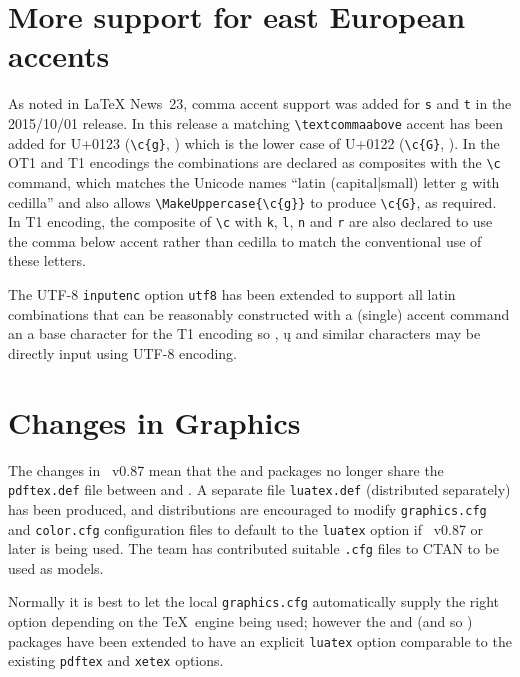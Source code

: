 \documentclass{ltnews}
\begin{document}
\section{More support for east European accents}

As noted in \LaTeX{} News~23, comma accent support was added for \texttt{s} and
\texttt{t} in the 2015/10/01 release. In this release a matching
\verb|\textcommaabove| accent has been added for U+0123 (\verb|\c{g}|,
) which is the lower case of U+0122 (\verb|\c{G}|,
).  In the OT1 and T1 encodings the combinations are
declared as composites with the \verb|\c| command, which matches the
Unicode names ``\textsf{latin (capital|small) letter g with cedilla}'' and
also allows \verb|\MakeUppercase{\c{g}}| to produce \verb|\c{G}|, as
required.  In T1 encoding, the composite of \verb|\c| with \texttt{k}, \texttt{l},
\texttt{n} and \texttt{r} are also
declared to use the comma below accent rather than cedilla to match the
conventional use of these letters.

The UTF-8 \texttt{inputenc} option \texttt{utf8} has been extended to
support all latin combinations that can be reasonably constructed with a
(single) accent command an a base character for the T1 encoding so
, \k{u} and similar characters may be directly input
using UTF-8 encoding.

\section{Changes in Graphics}

The changes in ~v0.87 mean that the  and
 packages no longer share the \texttt{pdftex.def} file
between  and . A separate file
\texttt{luatex.def} (distributed separately) has been produced, and
distributions are encouraged to modify \texttt{graphics.cfg} and
\texttt{color.cfg} configuration files to default to the \texttt{luatex}
option if ~v0.87 or later is being used. The team has
contributed suitable \texttt{.cfg} files to CTAN to be used
as models.

Normally it is best to let the local \texttt{graphics.cfg}
automatically supply the right option depending on the \TeX\ engine
being used; however the  and  (and so
) packages have been extended to have an explicit
\texttt{luatex} option comparable to the existing \texttt{pdftex} and
\texttt{xetex} options.
\end{document}
